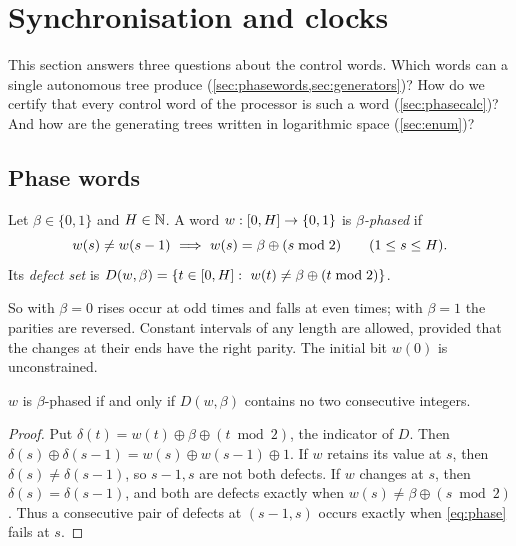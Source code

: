 \section{Synchronisation and clocks}\label{sec:clocks}

This section answers three questions about the control words. Which words can a single autonomous
tree produce (\cref{sec:phasewords,sec:generators})? How do we certify that every control word of the
processor is such a word (\cref{sec:phasecalc})? And how are the generating trees written in
logarithmic space (\cref{sec:enum})?

\subsection{Phase words}\label{sec:phasewords}

\begin{definition}\label{def:phaseword}
Let $\beta\in\{0,1\}$ and $H\in\mathbb N$. A word $w:[0,H]\to\{0,1\}$ is \emph{$\beta$-phased} if
\begin{equation}\label{eq:phase}
w(s)\ne w(s-1)\ \Longrightarrow\ w(s)=\beta\oplus(s\bmod 2)\qquad(1\le s\le H).
\end{equation}
Its \emph{defect set} is $D(w,\beta)=\{t\in[0,\Hz]:\ w(t)\ne\beta\oplus(t\bmod 2)\}$.
\end{definition}

So with $\beta=0$ rises occur at odd times and falls at even times; with $\beta=1$ the parities
are reversed. Constant intervals of any length are allowed, provided that the changes at their ends
have the right parity. The initial bit $w(0)$ is unconstrained.

\begin{lemma}[Characterisation]\label{lem:charwords}
$w$ is $\beta$-phased if and only if $D(w,\beta)$ contains no two consecutive integers.
\end{lemma}

\begin{proof}
Put $\delta(t)=w(t)\oplus\beta\oplus(t\bmod 2)$, the indicator of $D$. Then
$\delta(s)\oplus\delta(s-1)=w(s)\oplus w(s-1)\oplus 1$. If $w$ retains its value at $s$, then
$\delta(s)\ne\delta(s-1)$, so $s-1,s$ are not both defects. If $w$ changes at $s$, then
$\delta(s)=\delta(s-1)$, and both are defects exactly when $w(s)\ne\beta\oplus(s\bmod 2)$. Thus a
consecutive pair of defects at $(s-1,s)$ occurs exactly when \eqref{eq:phase} fails at $s$.
\end{proof}

